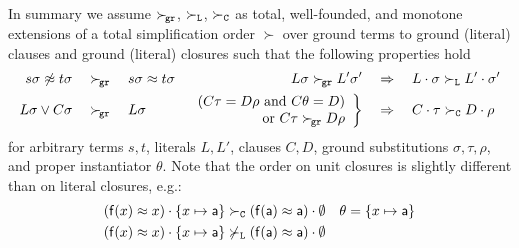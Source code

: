 \begin{remark}
    In summary we assume \( \mathrel\succ_{\!\mathtt{gr}} \), \( \mathrel\succ_{\mathtt{L}} \), \( \mathrel\succ_{\mathtt{C}} \) as
        total, well-founded, and monotone extensions of a
        total simplification order \( \succ \)
        over ground terms to ground (literal) clauses
        and ground (literal) closures
        such that the following properties hold
       \begin{align*}
            s\sigma\not\approx t\sigma \quad&\mathrel\succ_{\!\mathtt{gr}}\quad s\sigma\approx t\sigma
           &
           L\sigma \mathrel\succ_{\!\mathtt{gr}} L'\sigma'
           \quad&\Rightarrow\quad
            L\cdot\sigma \mathrel\succ_{\mathtt{L}} L'\cdot\sigma'
           \\
            L\sigma\lor C\sigma \quad&\mathrel\succ_{\!\mathtt{gr}}\quad L\sigma
       &
       \left.
       \begin{array}{r}
        (C\tau=D\rho\text{ and }C\theta=D)
        \\
        \text{or } C\tau\mathrel\succ_{\!\mathtt{gr}} D\rho
    \end{array}
       \right \}
           \quad&\Rightarrow\quad
            C\cdot\tau\mathrel\succ_{\mathtt{C}}{} D\cdot\rho{}
       \end{align*}
        for arbitrary terms \( s,t \),
        literals \( L, L' \),
        clauses \( C,D \),
        ground substitutions \( \sigma, \tau, \rho \),
        and proper instantiator \( \theta \).
        Note that the order on unit closures is slightly different than on literal closures, e.g.:
       \begin{align*} 
            (\mathsf{f}(x)\approx x)\cdot \{ x\mapsto \mathsf{a} \}
            &\mathrel\succ_{\mathtt{C}}
            (\mathsf{f}(\mathsf{a})\approx\mathsf{a})\cdot\emptyset
            & \theta = \{ x\mapsto \mathsf{a} \}
       \\
        (\mathsf{f}(x)\approx x)\cdot \{ x\mapsto \mathsf{a} \}
        &\not\mathrel\succ_{\mathtt{L}}
        (\mathsf{f}(\mathsf{a})\approx\mathsf{a})\cdot\emptyset
       \end{align*}
\end{remark}



